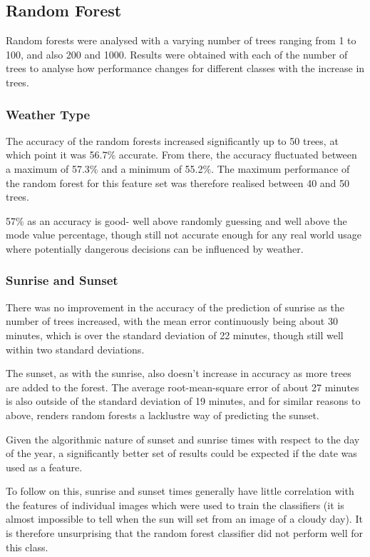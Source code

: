 \documentclass[a4paper,12pt,twoside]{report}
\begin{document}
\subsection{Random Forest}
Random forests were analysed with a varying number of trees ranging from 1 to 100, and also 200 and 1000. Results were obtained with each of the number of trees to analyse how performance changes for different classes with the increase in trees.

\subsubsection{Weather Type}

The accuracy of the random forests increased significantly up to 50 trees, at which point it was 56.7\% accurate. From there, the accuracy fluctuated between a maximum of 57.3\% and a minimum of 55.2\%. The maximum performance of the random forest for this feature set was therefore realised between 40 and 50 trees.

57\% as an accuracy is good- well above randomly guessing and well above the mode value percentage, though still not accurate enough for any real world usage where potentially dangerous decisions can be influenced by weather.

\subsubsection{Sunrise and Sunset}


There was no improvement in the accuracy of the prediction of sunrise as the number of trees increased, with the mean error continuously being about 30 minutes, which is over the standard deviation of 22 minutes, though still well within two standard deviations.

The sunset, as with the sunrise, also doesn't increase in accuracy as more trees are added to the forest. The average root-mean-square error of about 27 minutes is also outside of the standard deviation of 19 minutes, and for similar reasons to above, renders random forests a lacklustre way of predicting the sunset.

Given the algorithmic nature of sunset and sunrise times with respect to the day of the year, a significantly better set of results could be expected if the date was used as a feature.

To follow on this, sunrise and sunset times generally have little correlation with the features of individual images which were used to train the classifiers (it is almost impossible to tell when the sun will set from an image of a cloudy day). It is therefore unsurprising that the random forest classifier did not perform well for this class.
\end{document}
